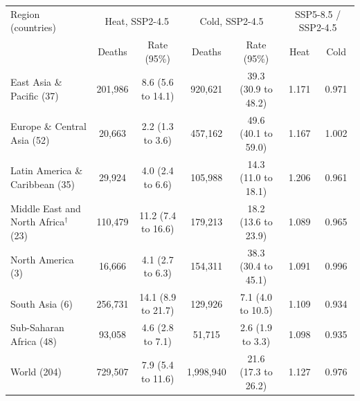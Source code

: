 \begin{tabular}{lcccccc}
\toprule
Region (countries) & \multicolumn{2}{c}{Heat, SSP2-4.5} & \multicolumn{2}{c}{Cold, SSP2-4.5} & \multicolumn{2}{c}{SSP5-8.5 / SSP2-4.5} \\ & Deaths & Rate (95\%) & Deaths & Rate (95\%) & Heat & Cold \\
\midrule
East Asia \& Pacific (37) & 201,986 & 8.6 (5.6 to 14.1) & 920,621 & 39.3 (30.9 to 48.2) & 1.171 & 0.971 \\
Europe \& Central Asia (52) & 20,663 & 2.2 (1.3 to 3.6) & 457,162 & 49.6 (40.1 to 59.0) & 1.167 & 1.002 \\
Latin America \& Caribbean (35) & 29,924 & 4.0 (2.4 to 6.6) & 105,988 & 14.3 (11.0 to 18.1) & 1.206 & 0.961 \\
Middle East and North Africa$^{\dagger}$ (23) & 110,479 & 11.2 (7.4 to 16.6) & 179,213 & 18.2 (13.6 to 23.9) & 1.089 & 0.965 \\
North America (3) & 16,666 & 4.1 (2.7 to 6.3) & 154,311 & 38.3 (30.4 to 45.1) & 1.091 & 0.996 \\
South Asia (6) & 256,731 & 14.1 (8.9 to 21.7) & 129,926 & 7.1 (4.0 to 10.5) & 1.109 & 0.934 \\
Sub-Saharan Africa (48) & 93,058 & 4.6 (2.8 to 7.1) & 51,715 & 2.6 (1.9 to 3.3) & 1.098 & 0.935 \\
World (204) & 729,507 & 7.9 (5.4 to 11.6) & 1,998,940 & 21.6 (17.3 to 26.2) & 1.127 & 0.976 \\
\bottomrule
\end{tabular}
